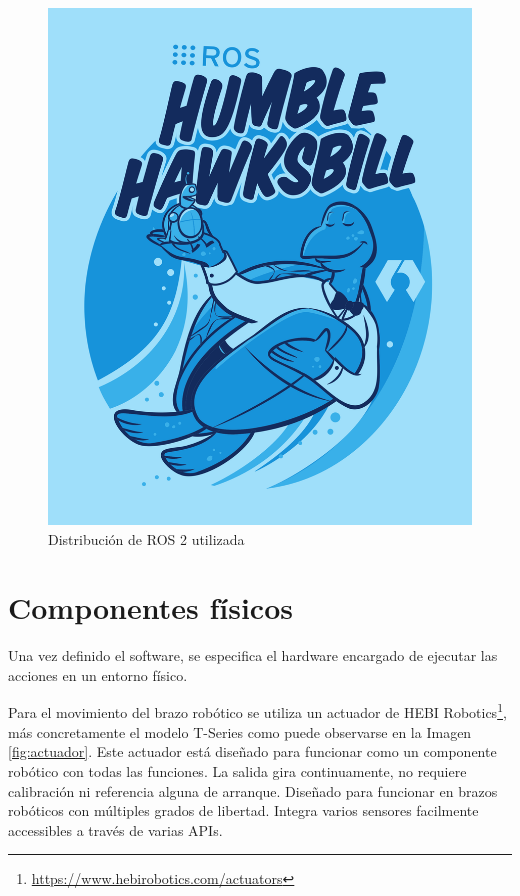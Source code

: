 \begin{figure}[ht!]
	\centering
	\begin{minipage}{0.35\linewidth}
		\centering
		\includegraphics[width=\linewidth]{figs/humble.png}
	\end{minipage}
	\caption[Distribución de ROS 2 utilizada]{Distribución de ROS 2 utilizada}
	\label{fig:rosdis}
\end{figure}

\section{Componentes físicos}
\label{sec:entornos}

Una vez definido el software, se especifica el hardware encargado de ejecutar las acciones en un entorno físico.

Para el movimiento del brazo robótico se utiliza un actuador de HEBI Robotics\footnote{\url{https://www.hebirobotics.com/actuators}}, más concretamente el modelo T-Series como puede observarse en la Imagen \ref{fig:actuador}.
Este actuador está diseñado para funcionar como un componente robótico con todas las funciones.
La salida gira continuamente, no requiere calibración ni referencia alguna de arranque.
Diseñado para funcionar en brazos robóticos con múltiples grados de libertad.
Integra varios sensores facilmente accessibles a través de varias APIs.

